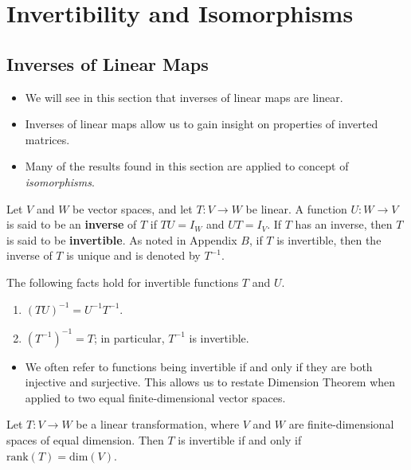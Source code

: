 \section{Invertibility and Isomorphisms}

\subsection{Inverses of Linear Maps}
\begin{itemize}
    \item We will see in this section that inverses of linear maps are linear.
    \item Inverses of linear maps allow us to gain insight on properties of inverted matrices.
    \item Many of the results found in this section are applied to concept of \textit{isomorphisms}. 
\end{itemize}

\begin{definition}
    Let \( V  \) and \( W  \) be vector spaces, and let \( T: V \to W  \) be linear. A function \( U: W \to V  \) is said to be an \textbf{inverse} of \( T  \) if \( TU = {I}_{W} \) and \( UT = {I}_{V} \). If \( T  \) has an inverse, then \( T  \) is said to be \textbf{invertible}. As noted in Appendix \( B  \), if \( T  \) is invertible, then the inverse of \( T  \) is unique and is denoted by \( T^{-1} \). 
\end{definition}

The following facts hold for invertible functions \( T  \) and \( U  \).
\begin{enumerate}
    \item \( (TU)^{-1} = U^{-1} T^{-1} \).
    \item \( (T^{-1})^{-1} = T  \); in particular, \( T^{-1}  \) is invertible.
\end{enumerate}

\begin{itemize}
    \item We often refer to functions being invertible if and only if they are both injective and surjective. This allows us to restate Dimension Theorem when applied to two equal finite-dimensional vector spaces.
\end{itemize}

\begin{theorem}\label{Fact 3}
  Let \( T: V \to W  \) be a linear transformation, where \( V  \) and \( W  \) are finite-dimensional spaces of equal dimension. Then \( T  \) is invertible if and only if \( \text{rank}(T) = \text{dim}(V ) \).  
\end{theorem}

